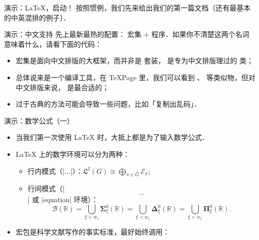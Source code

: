 \begin{frame}[t,fragile]{演示：\LaTeX{}，启动！}
    按照惯例，我们先来给出我们的第一篇文档（还有最基本的中英混排的例子）．\pause 
	\pause 
\end{frame}

\begin{frame}[t,fragile]{演示：中文支持}
	\pause
	先上最新最热的配置：\CTeX{} 宏集 $+$ \XeLaTeX{} 程序．如果你不清楚这两个名词意味着什么，请看下面的代码：\pause
	\pause
	\begin{itemize}
		\item<+-> \CTeX{} 宏集是面向中文排版的大框架，而并非是 \CTeX{} 套装， 是专为中文排版理过的  类；
		\item<+-> \XeLaTeX{} 总体说来是一个编译工具，在 TeXPage 里，我们可以看到 \LuaLaTeX{}、\pdfLaTeX{} 等类似物，但对中文排版来说，\XeLaTeX{} 是最合适的；
		\item<+-> 过于古典的方法可能会导致一些问题，比如「复制出乱码」．
	\end{itemize}
\end{frame}

\begin{frame}[fragile]{演示：数学公式（一）}
	\pause
	\begin{itemize}
		\item<+-> 当我们第一次使用 \LaTeX{} 时，大抵上都是为了输入数学公式．
		\item<+-> \LaTeX{} 上的数学环境可以分为两种：
			\begin{itemize}
				\item 行内模式（|$...$|）：$\mathfrak L^2(G) \cong \bigoplus_{\pi \in \widehat{G}}\mathcal E_\pi$;
				\item 行间模式（|\[...\]| 或 |equation| 环境）：
				      \[\mathcal B(\mathbb R) = \bigcup_{\xi<w_1}\symbf\Sigma_\xi^0(\mathbb R) = \bigcup_{\xi<w_1}\symbf\Delta_\xi^0(\mathbb R) = \bigcup_{\xi<w_1}\symbf\Pi_\xi^0(\mathbb R).\]
			\end{itemize}
		\item<+->  宏包是科学文献写作的事实标准，最好始终调用：\onslide<+->
			
	\end{itemize}
\end{frame}

